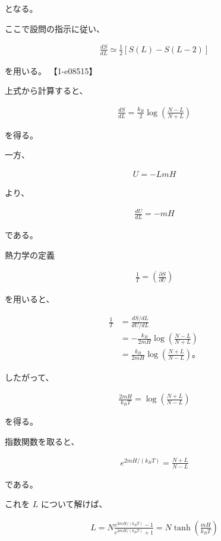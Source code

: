 \documentclass[platex,dvipdfmx,a4paper]{jsarticle}
\begin{document}
となる。

ここで設問の指示に従い、

\begin{align*}
\frac{dS}{dL}
\simeq
\frac12
\left[
S(L)-S(L-2)
\right]
\end{align*}

を用いる。 【1-e08515】

上式から計算すると、

\begin{align*}
\frac{dS}{dL}
=
\frac{k_B}{2}
\log
\left(
\frac{N-L}{N+L}
\right)
\end{align*}

を得る。

一方、

\begin{align*}
U=-LmH
\end{align*}

より、

\begin{align*}
\frac{dU}{dL}
=
-mH
\end{align*}

である。

熱力学の定義

\begin{align*}
\frac{1}{T}
=
\left(
\frac{\partial S}{\partial U}
\right)
\end{align*}

を用いると、

\begin{align*}
\frac1T
&=
\frac{dS/dL}{dU/dL}
\\
&=
-\frac{k_B}{2mH}
\log
\left(
\frac{N-L}{N+L}
\right)
\\
&=
\frac{k_B}{2mH}
\log
\left(
\frac{N+L}{N-L}
\right)。
\end{align*}

したがって、

\begin{align*}
\frac{2mH}{k_BT}
=
\log
\left(
\frac{N+L}{N-L}
\right)
\end{align*}

を得る。

指数関数を取ると、

\begin{align*}
e^{2mH/(k_BT)}
=
\frac{N+L}{N-L}
\end{align*}

である。

これを $L$ について解けば、

\begin{align*}
L
=
N
\frac{
e^{2mH/(k_BT)}-1
}{
e^{2mH/(k_BT)}+1
}
=
N\tanh
\left(
\frac{mH}{k_BT}
\right)
\end{align*}
\end{document}
